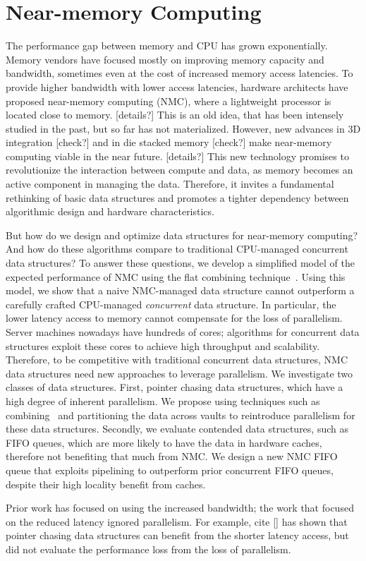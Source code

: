 \section{Near-memory Computing}

The performance gap between memory and CPU has grown exponentially. Memory vendors have focused mostly on improving memory capacity and bandwidth, sometimes even at the cost of increased memory access latencies. To provide higher bandwidth with lower access latencies, hardware architects have proposed near-memory computing (NMC), where a lightweight processor is located close to memory. [details?] This is an old idea, that has been intensely studied in the past, but so far has not materialized. However, new advances in 3D integration [check?] and in die stacked memory [check?] make near-memory computing viable in the near future. [details?] This new technology promises to revolutionize the interaction between compute and data, as memory becomes an active component in managing the data. Therefore, it invites a fundamental rethinking of basic data structures and promotes a tighter dependency between algorithmic design and hardware characteristics. 

But how do we design and optimize data structures for near-memory computing? And how do these algorithms compare to traditional CPU-managed concurrent data structures? To answer these questions, we develop a simplified model of the expected performance of NMC using the flat combining technique~\cite{}. Using this model, we show that a naive NMC-managed data structure cannot outperform a carefully crafted CPU-managed \emph{concurrent} data structure. In particular, the lower latency access to memory cannot compensate for the loss of parallelism. Server machines nowadays have hundreds of cores; algorithms for concurrent data structures exploit these cores to achieve high throughput and scalability. Therefore, to be competitive with traditional concurrent data structures, NMC data structures need new approaches to leverage parallelism. We investigate two classes of data structures. First, pointer chasing data structures, which have a high degree of inherent parallelism. We propose using techniques such as combining~\cite{} and partitioning the data across vaults to reintroduce parallelism for these data structures. Secondly, we evaluate contended data structures, such as FIFO queues, which are more likely to have the data in hardware caches, therefore not benefiting that much from NMC. We design a new NMC FIFO queue that exploits pipelining to outperform prior concurrent FIFO queues, despite their high locality benefit from caches. 

Prior work has focused on using the increased bandwidth; the work that focused on the reduced latency ignored parallelism. For example, cite [] has shown that pointer chasing data structures can benefit from the shorter latency access, but did not evaluate the performance loss from the loss of parallelism. 

